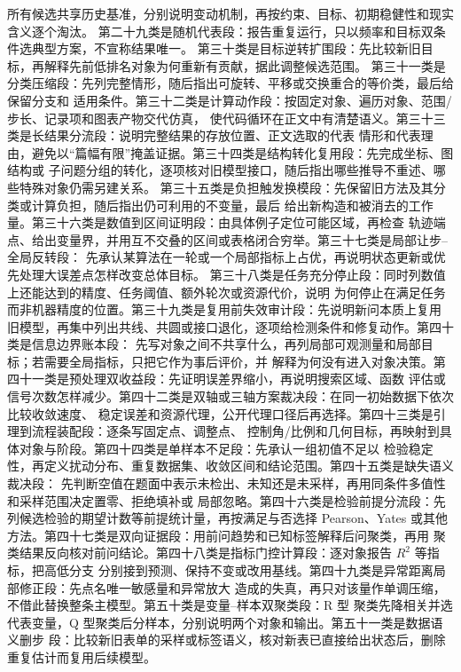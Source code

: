 所有候选共享历史基准，分别说明变动机制，再按约束、目标、初期稳健性和现实含义逐个淘汰。
第二十九类是随机代表段：报告重复运行，只以频率和目标双条件选典型方案，不宣称结果唯一。
第三十类是目标逆转扩围段：先比较新旧目标，再解释先前低排名对象为何重新有贡献，据此调整候选范围。
第三十一类是分类压缩段：先列完整情形，随后指出可旋转、平移或交换重合的等价类，最后给保留分支和
适用条件。第三十二类是计算动作段：按固定对象、遍历对象、范围/步长、记录项和图表产物交代仿真，
使代码循环在正文中有清楚语义。第三十三类是长结果分流段：说明完整结果的存放位置、正文选取的代表
情形和代表理由，避免以“篇幅有限”掩盖证据。第三十四类是结构转化复用段：先完成坐标、图结构或
子问题分组的转化，逐项核对旧模型接口，随后指出哪些推导不重述、哪些特殊对象仍需另建关系。
第三十五类是负担触发换模段：先保留旧方法及其分类或计算负担，随后指出仍可利用的不变量，最后
给出新构造和被消去的工作量。第三十六类是数值到区间证明段：由具体例子定位可能区域，再检查
轨迹端点、给出变量界，并用互不交叠的区间或表格闭合穷举。第三十七类是局部让步--全局反转段：
先承认某算法在一轮或一个局部指标上占优，再说明状态更新或优先处理大误差点怎样改变总体目标。
第三十八类是任务充分停止段：同时列数值上还能达到的精度、任务阈值、额外轮次或资源代价，说明
为何停止在满足任务而非机器精度的位置。第三十九类是复用前失效审计段：先说明新问本质上复用
旧模型，再集中列出共线、共圆或接口退化，逐项给检测条件和修复动作。第四十类是信息边界账本段：
先写对象之间不共享什么，再列局部可观测量和局部目标；若需要全局指标，只把它作为事后评价，并
解释为何没有进入对象决策。第四十一类是预处理双收益段：先证明误差界缩小，再说明搜索区域、函数
评估或信号次数怎样减少。第四十二类是双轴或三轴方案裁决段：在同一初始数据下依次比较收敛速度、
稳定误差和资源代理，公开代理口径后再选择。第四十三类是引理到流程装配段：逐条写固定点、调整点、
控制角/比例和几何目标，再映射到具体对象与阶段。第四十四类是单样本不足段：先承认一组初值不足以
检验稳定性，再定义扰动分布、重复数据集、收敛区间和结论范围。第四十五类是缺失语义裁决段：
先判断空值在题面中表示未检出、未知还是未采样，再用同条件多值性和采样范围决定置零、拒绝填补或
局部忽略。第四十六类是检验前提分流段：先列候选检验的期望计数等前提统计量，再按满足与否选择
Pearson、Yates 或其他方法。第四十七类是双向证据段：用前问趋势和已知标签解释后问聚类，再用
聚类结果反向核对前问结论。第四十八类是指标门控计算段：逐对象报告 $R^2$ 等指标，把高低分支
分别接到预测、保持不变或改用基线。第四十九类是异常距离局部修正段：先点名唯一敏感量和异常放大
造成的失真，再只对该量作单调压缩，不借此替换整条主模型。第五十类是变量--样本双聚类段：R 型
聚类先降相关并选代表变量，Q 型聚类后分样本，分别说明两个对象和输出。第五十一类是数据语义删步
段：比较新旧表单的采样或标签语义，核对新表已直接给出状态后，删除重复估计而复用后续模型。
